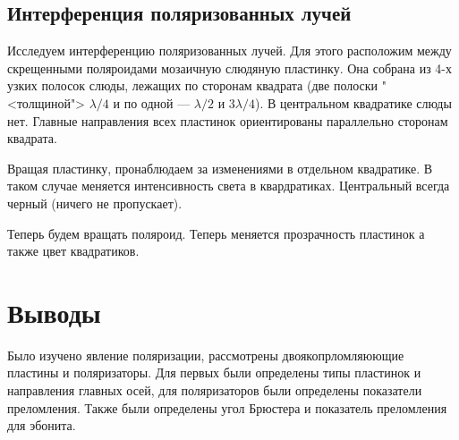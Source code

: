 \documentclass[a4paper, 12pt]{article}
\begin{document}
\subsection{Интерференция поляризованных лучей}

Исследуем интерференцию поляризованных лучей. Для этого расположим между скрещенными поляроидами мозаичную слюдяную пластинку. Она собрана из 4-х узких полосок слюды, лежащих по сторонам
квадрата (две полоски "<толщиной"> $ \lambda/4 $ и по одной --- $ \lambda/2 $ и $ 3\lambda/4 $). В центральном квадратике слюды нет. Главные направления всех пластинок ориентированы параллельно сторонам квадрата.

Вращая пластинку, пронаблюдаем за изменениями в отдельном квадратике. В таком случае меняется интенсивность света в квардратиках. Центральный всегда черный (ничего не пропускает).

Теперь будем вращать поляроид. Теперь меняется прозрачность пластинок а также цвет квадратиков.



 \section{Выводы}
Было изучено явление поляризации, рассмотрены двоякопрломляюющие пластины и поляризаторы. Для первых были определены типы пластинок и направления главных осей, для поляризаторов были определены показатели преломления. Также были определены угол Брюстера и показатель преломления для эбонита.
\end{document}
